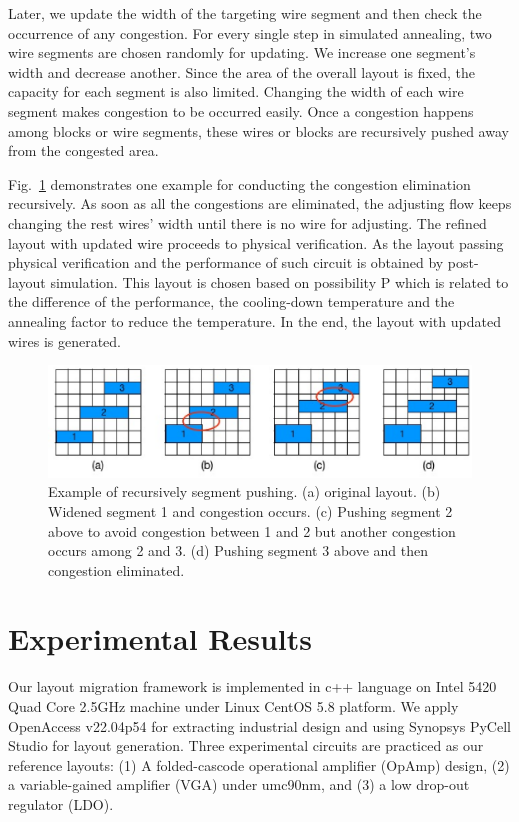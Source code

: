     Later, we update the width of the targeting wire segment and then check the occurrence of any congestion. For every single step in simulated annealing, two wire segments are chosen randomly for updating. We increase one segment's width and decrease another. Since the area of the overall layout is fixed, the capacity for each segment is also limited. Changing the width of each wire segment makes congestion to be occurred easily. Once a congestion happens among blocks or wire segments, these wires or blocks are recursively pushed away from the congested area.

    Fig.~\ref{fig:Congestion} demonstrates one example for conducting the congestion elimination recursively. As soon as all the congestions are eliminated, the adjusting flow keeps changing the rest wires' width until there is no wire for adjusting. The refined layout with updated wire proceeds to physical verification. As the layout passing physical verification and the performance of such circuit is obtained by post-layout simulation. This layout is chosen based on possibility P which is related to the difference of the performance, the cooling-down temperature and the annealing factor to reduce the temperature. In the end, the layout with updated wires is generated.
    \begin{figure}[t]
      \centering
      \centerline{\includegraphics[width=\textwidth]{Fig/Chapter4/Congestion.eps}}
      \caption{Example of recursively segment pushing. (a) original layout. (b) Widened segment 1 and congestion occurs. (c) Pushing segment 2 above to avoid congestion between 1 and 2 but another congestion occurs among 2 and 3. (d) Pushing segment 3 above and then congestion eliminated.} 
      \label{fig:Congestion}
    \end{figure}


  \section{Experimental Results}\label{sec:RLPADMExp}

    Our layout migration framework is implemented in c++ language on Intel 5420 Quad Core 2.5GHz machine under Linux CentOS 5.8 platform. We apply OpenAccess v22.04p54 for extracting industrial design and using Synopsys PyCell Studio for layout generation. Three experimental circuits are practiced as our reference layouts: (1) A folded-cascode operational amplifier (OpAmp) design, (2) a variable-gained amplifier (VGA) under umc90nm, and (3) a low drop-out regulator (LDO). 


